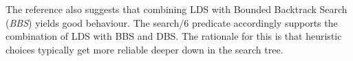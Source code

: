 The reference also suggests that combining LDS with Bounded Backtrack
Search ({\em BBS}) yields good behaviour. The search/6 predicate
accordingly supports the combination of LDS with BBS and DBS.
The rationale for this is that heuristic choices typically get
more reliable deeper down in the search tree.


%
%
%
